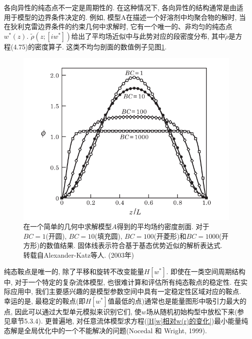 各向异性的纯态点不一定是周期性的. 在这种情况下, 各向异性的结构通常是由适用于模型的边界条件决定的. 例如, 模型A在描述一个好溶剂中均聚合物的解时, 当在狄利克雷边界条件的约束几何中求解时, 它有一个唯一的、非均匀的纯态点$w^*(z)$. $\tilde{\rho}(z;[iw^*])$给出了平均场近似中与此势对应的段密度分布, 其中$\tilde{\rho}$是方程(4.75)的密度算子. 这类不均匀剖面的数值例子见图\ref{剖面}. 
\begin{figure}[H]
       \centering
        \includegraphics[width=12cm]{./figures/2.png}
       \caption{在一个简单的几何中求解模型$A$得到的平均场约密度剖面. 对于$BC=1$(开圆), $BC=10$(填充圆), $BC=100$(开菱形)和$BC=1000$(开方形)的数值结果. 固体线表示符合基于基态优势近似的解析表达式. 转载自Alexander-Katz等人. (2003年)}
        \label{剖面}
 \end{figure}

纯态鞍点是唯一的, 除了平移和旋转不改变能量$H[w^*]$. 即使在一类空间周期结构中, 对于一个特定的复杂流体模型, 也很难计算和评估所有纯态鞍点的稳定性. 在实际应用中, 我们主要感兴趣的是模型参数空间中具有一定稳定性区域对应的鞍点. 幸运的是, 最稳定的鞍点(即$H[w^*]$值最低的点)通常也是能量图形中吸引力最大的点, 因此可以通过大型单元模拟来识别它们, 使$w$场从随机初始构型中放松下来(参见章节5.3.4). 更普遍地, 对任意流体模型求方程(\ref{H[w]相对w(r)的变化})最小能量纯态解是全局优化中的一个不能解决的问题(Nocedal 和 Wright, 1999). \\

